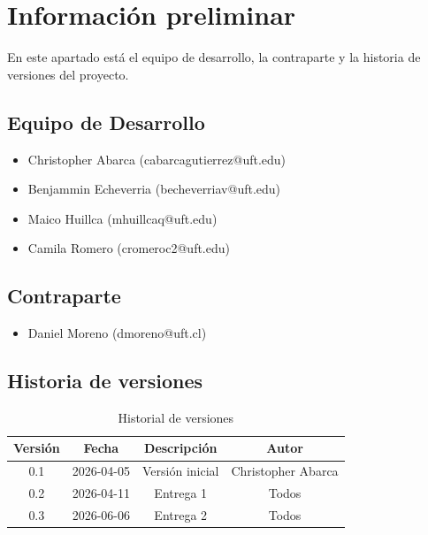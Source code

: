 \documentclass[11pt,a4paper]{Plantilla}
\begin{document}
\fairemarges%
\portada%

\section*{Información preliminar}
En este apartado está el equipo de desarrollo, la contraparte y la historia de versiones del proyecto.


\subsection*{Equipo de Desarrollo}
\begin{itemize}
    \item Christopher Abarca (cabarcagutierrez@uft.edu)
    \item Benjammin Echeverria (becheverriav@uft.edu)
    \item Maico Huillca (mhuillcaq@uft.edu)
    \item Camila Romero (cromeroc2@uft.edu)
\end{itemize}

\subsection*{Contraparte}
\begin{itemize}

    \item Daniel Moreno (dmoreno@uft.cl)
\end{itemize}

\subsection*{Historia de versiones}

\begin{table}[H]
\centering
\caption{Historial de versiones}
\label{tab:historial-versiones}
\begin{tabular}{|c|c|c|c|}
\hline
\textbf{Versión} & \textbf{Fecha} & \textbf{Descripción} & \textbf{Autor} \\
\hline
0.1 & 2026-04-05 & Versión inicial & Christopher Abarca \\
\hline
0.2 & 2026-04-11 & Entrega 1 & Todos\\
\hline
0.3 & 2026-06-06 & Entrega 2 & Todos\\
\hline
\end{tabular}
\end{table}
\newpage

\tableofcontents
\listoftables
\end{document}
